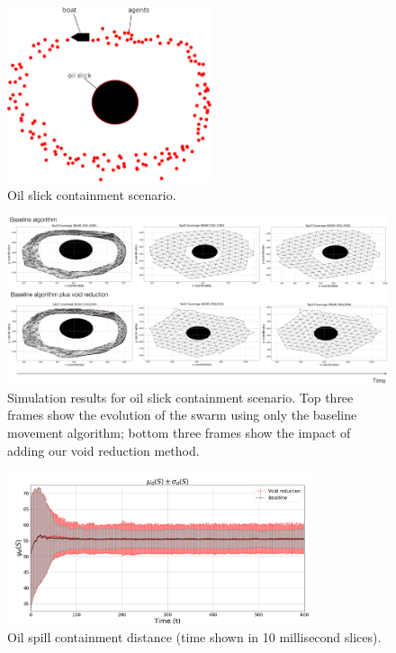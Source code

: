 \documentclass[letterpaper]{article}
\begin{document}
 \begin{figure}
 \begin{center}
 \includegraphics[width=6cm]{figures/OilSlick}
 \end{center}
 \caption{Oil slick containment scenario. \label{voids:OilSlick}}
 \end{figure}

\begin{figure}[ht!]
  \includegraphics[width=18cm]{figures/spillresults}
  \caption{Simulation results for oil slick containment scenario. Top three frames show the evolution of the swarm using only the baseline movement algorithm; bottom three frames show the impact of adding our void reduction method.}
  \label{spillresults}
\end{figure}

\begin{figure}
 \begin{center}
 \includegraphics[width=9cm]{figures/OilSpillDistance}
 \end{center}
 \caption{Oil spill containment distance (time shown in 10 millisecond slices). \label{concave:OilSpillPerimeter8060-DIST-1}}
 \end{figure}
\end{document}
